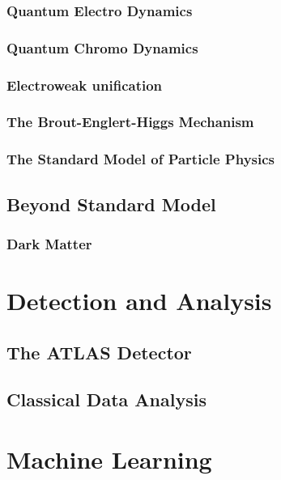 \documentclass[14pt, a4paper]{book}
\begin{document}
\subsection{Quantum Electro Dynamics}

\subsection{Quantum Chromo Dynamics}


\subsection{Electroweak unification}


\subsection{The Brout-Englert-Higgs Mechanism}


\subsection{The Standard Model of Particle Physics}


\section{Beyond Standard Model}

\subsection{Dark Matter}



\chapter{Detection and Analysis}


\section{The ATLAS Detector}


\section{Classical Data Analysis}



\chapter{Machine Learning}

\end{document}
